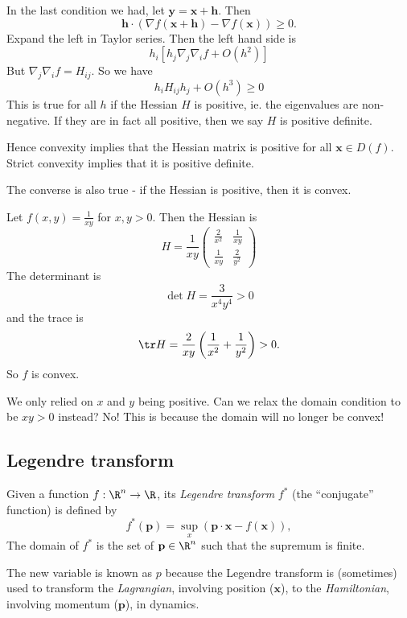 \documentclass[a4paper]{article}
\begin{document}
In the last condition we had, let $\mathbf{y} = \mathbf{x} + \mathbf{h}$. Then
\[
  \mathbf{h} \cdot (\nabla f(\mathbf{x} + \mathbf{h}) - \nabla f(\mathbf{x})) \geq 0.
\]
Expand the left in Taylor series. Then the left hand side is
\[
  h_i [h_j \nabla_j \nabla_i f + O(h^2)]
\]
But $\nabla_j \nabla_i f = H_{ij}$. So we have
\[
  h_i H_{ij}h_j + O(h^3) \geq 0
\]
This is true for all $h$ if the Hessian $H$ is positive, ie. the eigenvalues are non-negative. If they are in fact all positive, then we say $H$ is positive definite.

Hence convexity implies that the Hessian matrix is positive for all $\mathbf{x}\in D(f)$. Strict convexity implies that it is positive definite.

The converse is also true - if the Hessian is positive, then it is convex.

\begin{eg}
  Let $f(x, y) = \frac{1}{xy}$ for $x, y > 0$. Then the Hessian is
  \[
    H = \frac{1}{xy}
    \begin{pmatrix}
      \frac{2}{x^2} & \frac{1}{xy}\\
      \frac{1}{xy} & \frac{2}{y^2}
    \end{pmatrix}
  \]
  The determinant is
  \[
    \det H = \frac{3}{x^4y^4} > 0
  \]
  and the trace is
  \[
    \tr H = \frac{2}{xy}\left(\frac{1}{x^2} + \frac{1}{y^2}\right) > 0.
  \]
  So $f$ is convex.

  We only relied on $x$ and $y$ being positive. Can we relax the domain condition to be $xy > 0$ instead? No! This is because the domain will no longer be convex!
\end{eg}

\subsection{Legendre transform}
\begin{defi}
  Given a function $f: \R^n \to \R$, its \emph{Legendre transform} $f^*$ (the ``conjugate'' function) is defined by
  \[
    f^*(\mathbf{p}) = \sup_{x}(\mathbf{p}\cdot \mathbf{x} - f(\mathbf{x})),
  \]
  The domain of $f^*$ is the set of $\mathbf{p}\in \R^n$ such that the supremum is finite.
\end{defi}
The new variable is known as $p$ because the Legendre transform is (sometimes) used to transform the \emph{Lagrangian}, involving position ($\mathbf{x}$), to the \emph{Hamiltonian}, involving momentum ($\mathbf{p}$), in dynamics.
\end{document}
